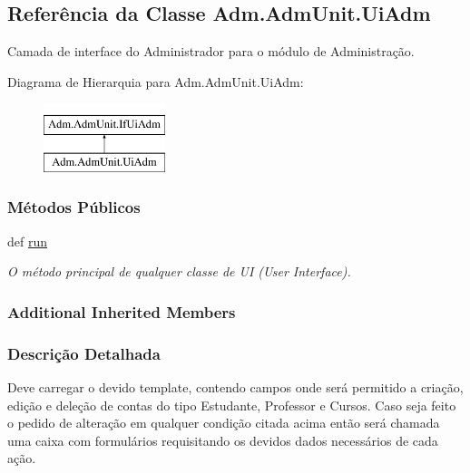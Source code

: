 \hypertarget{classAdm_1_1AdmUnit_1_1UiAdm}{\subsection{Referência da Classe Adm.\-Adm\-Unit.\-Ui\-Adm}
\label{classAdm_1_1AdmUnit_1_1UiAdm}
}


Camada de interface do Administrador para o módulo de Administração.  


Diagrama de Hierarquia para Adm.\-Adm\-Unit.\-Ui\-Adm\-:\begin{figure}[H]
\begin{center}
\leavevmode
\includegraphics[height=2.000000cm]{d4/dde/classAdm_1_1AdmUnit_1_1UiAdm}
\end{center}
\end{figure}
\subsubsection*{Métodos Públicos}
\begin{DoxyCompactItemize}
\item 
def \hyperlink{classAdm_1_1AdmUnit_1_1UiAdm_a88df3b19b48d71b2c0fc0b4557c71416}{run}
\begin{DoxyCompactList}\small\item\em O método principal de qualquer classe de U\-I (User Interface). \end{DoxyCompactList}\end{DoxyCompactItemize}
\subsubsection*{Additional Inherited Members}


\subsubsection{Descrição Detalhada}
Deve carregar o devido template, contendo campos onde será permitido a criação, edição e deleção de contas do tipo Estudante, Professor e Cursos. Caso seja feito o pedido de alteração em qualquer condição citada acima então será chamada uma caixa com formulários requisitando os devidos dados necessários de cada ação. 

